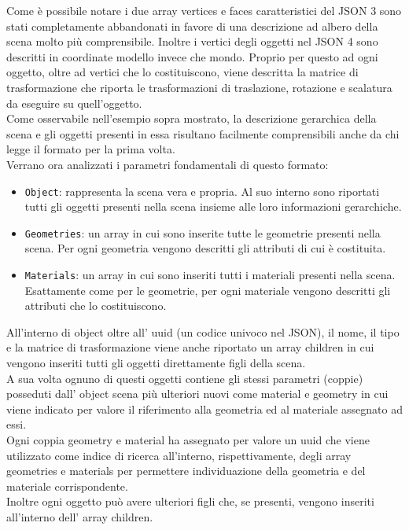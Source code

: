 Come è possibile notare i due array vertices e faces caratteristici del JSON 3 sono stati completamente abbandonati in favore di una descrizione ad albero della scena molto più comprensibile.
Inoltre i vertici degli oggetti nel JSON 4 sono descritti in coordinate modello invece che mondo. Proprio per questo ad ogni oggetto, oltre ad vertici che lo costituiscono, viene descritta la matrice di trasformazione che riporta le trasformazioni di traslazione, rotazione e scalatura da eseguire su quell’oggetto.
\\
Come osservabile nell’esempio sopra mostrato, la descrizione gerarchica della scena e gli oggetti presenti in essa risultano facilmente comprensibili anche da chi legge il formato per la prima volta.
\\
Verrano ora analizzati i parametri fondamentali di questo formato:

\begin{itemize}
\item \texttt{Object}: rappresenta la scena vera e propria. Al suo interno sono riportati tutti gli oggetti presenti nella scena insieme alle loro informazioni gerarchiche.
\item \texttt{Geometries}: un array in cui sono inserite tutte le geometrie presenti nella scena. Per ogni geometria vengono descritti gli attributi di cui è costituita.
\item \texttt{Materials}: un array in cui sono inseriti tutti i materiali presenti nella scena. Esattamente come per le geometrie, per ogni materiale vengono descritti gli attributi che lo costituiscono.
\end{itemize}
All’interno di object oltre all’ uuid (un codice univoco nel JSON), il nome, il tipo e la matrice di trasformazione viene anche riportato un array children in cui vengono inseriti tutti gli oggetti direttamente figli della scena.
\\
A sua volta ognuno di questi oggetti contiene gli stessi parametri (coppie) posseduti dall’ object scena più ulteriori nuovi come  material e geometry in cui viene indicato per valore il riferimento alla geometria ed al materiale assegnato ad essi.
\\
Ogni coppia geometry e material ha assegnato per valore un uuid che viene utilizzato come indice di ricerca all’interno, rispettivamente, degli array geometries e materials per permettere individuazione della geometria e del materiale corrispondente.
\\
Inoltre ogni oggetto può avere ulteriori figli che, se presenti, vengono inseriti all’interno dell’ array children.


